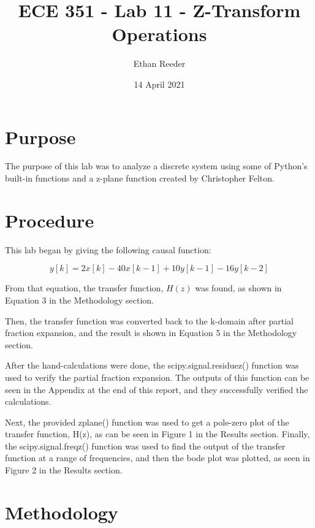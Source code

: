 \documentclass[12pt]{article}
\title{ECE 351 - Lab 11 - Z-Transform Operations}
\author{Ethan Reeder}
\date{14 April 2021}
\begin{document}
\lstset{language=Python}

\maketitle

\newpage

\tableofcontents

\newpage

\section{Purpose}

The purpose of this lab was to analyze a discrete system using some of Python's built-in functions and a z-plane function created by Christopher Felton.

\section{Procedure}

This lab began by giving the following causal function:

\begin{equation}
    y[k] = 2x[k] - 40x[k-1] + 10y[k-1] - 16y[k-2]
\end{equation}

From that equation, the transfer function, $H(z)$ was found, as shown in Equation 3 in the Methodology section.

Then, the transfer function was converted back to the k-domain after partial fraction expansion, and the result is shown in Equation 5 in the Methodology section.

After the hand-calculations were done, the scipy.signal.residuez() function was used to verify the partial fraction expansion. The outputs of this function can be seen in the Appendix at the end of this report, and they successfully verified the calculations.

Next, the provided zplane() function was used to get a pole-zero plot of the transfer function, H(z), as can be seen in Figure 1 in the Results section. Finally, the scipy.signal.freqz() function was used to find the output of the transfer function at a range of frequencies, and then the bode plot was plotted, as seen in Figure 2 in the Results section.

\section{Methodology}
\end{document}

